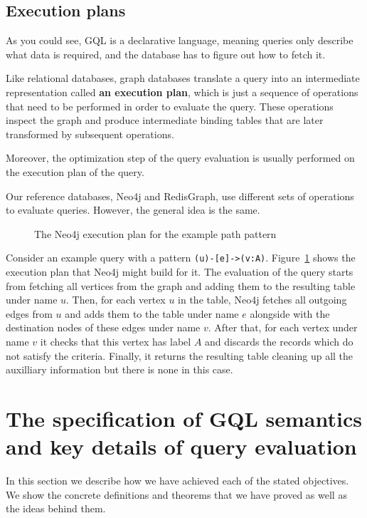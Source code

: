 \documentclass[14pt]{constructor-thesis}
\theoremstyle{definition}
\begin{document}
\subsection{Execution plans}

As you could see, GQL is a declarative language, meaning queries only describe what data is required, and the database has to figure out how to fetch it.

Like relational databases, graph databases translate a query into an intermediate representation called \textbf{an execution plan}, which is just a sequence of operations that need to be performed in order to evaluate the query. These operations inspect the graph and produce intermediate binding tables that are later transformed by subsequent operations.

Moreover, the optimization step of the query evaluation is usually performed on the execution plan of the query.

Our reference databases, Neo4j and RedisGraph, use different sets of operations to evaluate queries. However, the general idea is the same.

\begin{figure}
  
  \caption{The Neo4j execution plan for the example path pattern}
  \label{fig:intro-execution-plan}
\end{figure}

Consider an example query with a pattern \texttt{(u)-[e]->(v:A)}. Figure~\ref{fig:intro-execution-plan} shows the execution plan that Neo4j might build for it. The evaluation of the query starts from fetching all vertices from the graph and adding them to the resulting table under name $u$. Then, for each vertex $u$ in the table, Neo4j fetches all outgoing edges from $u$ and adds them to the table under name $e$ alongside with the destination nodes of these edges under name $v$. After that, for each vertex under name $v$ it checks that this vertex has label $A$ and discards the records which do not satisfy the criteria. Finally, it returns the resulting table cleaning up all the auxilliary information but there is none in this case.

\section{The specification of GQL semantics and key details of query evaluation}
\label{sec:technical-details}

In this section we describe how we have achieved each of the stated objectives. We show the concrete definitions and theorems that we have proved as well as the ideas behind them.
\end{document}

